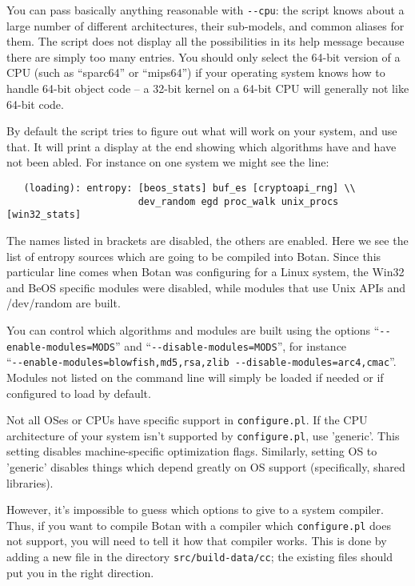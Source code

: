 \documentclass{article}
\newcommand{\filename}[1]{\texttt{#1}}
\begin{document}
You can pass basically anything reasonable with \verb|--cpu|: the
script knows about a large number of different architectures, their
sub-models, and common aliases for them. The script does not display
all the possibilities in its help message because there are simply too
many entries. You should only select the 64-bit version of a CPU (such
as ``sparc64'' or ``mips64'') if your operating system knows how to
handle 64-bit object code -- a 32-bit kernel on a 64-bit CPU will
generally not like 64-bit code.

By default the script tries to figure out what will work on your
system, and use that. It will print a display at the end showing
which algorithms have and have not been abled. For instance on one
system we might see the line:

\begin{verbatim}
   (loading): entropy: [beos_stats] buf_es [cryptoapi_rng] \\
                       dev_random egd proc_walk unix_procs [win32_stats]
\end{verbatim}

The names listed in brackets are disabled, the others are
enabled. Here we see the list of entropy sources which are going to be
compiled into Botan. Since this particular line comes when Botan was
configuring for a Linux system, the Win32 and BeOS specific modules
were disabled, while modules that use Unix APIs and /dev/random are
built.

You can control which algorithms and modules are built using the
options ``\verb|--enable-modules=MODS|'' and
``\verb|--disable-modules=MODS|'', for instance \\
``\verb|--enable-modules=blowfish,md5,rsa,zlib --disable-modules=arc4,cmac|''.
Modules not listed on the command line will simply be loaded if needed
or if configured to load by default.

Not all OSes or CPUs have specific support in
\filename{configure.pl}. If the CPU architecture of your system isn't
supported by \filename{configure.pl}, use 'generic'. This setting
disables machine-specific optimization flags. Similarly, setting OS to
'generic' disables things which depend greatly on OS support
(specifically, shared libraries).

However, it's impossible to guess which options to give to a system
compiler.  Thus, if you want to compile Botan with a compiler which
\filename{configure.pl} does not support, you will need to tell it how
that compiler works. This is done by adding a new file in the
directory \filename{src/build-data/cc}; the existing files should put you
in the right direction.
\end{document}
